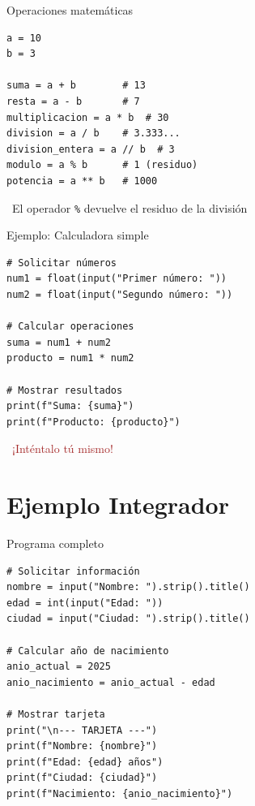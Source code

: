 \documentclass{beamer}
\begin{document}
\begin{frame}[fragile]{Operaciones matemáticas \ \faCalculator}

\begin{lstlisting}
a = 10
b = 3

suma = a + b        # 13
resta = a - b       # 7
multiplicacion = a * b  # 30
division = a / b    # 3.333...
division_entera = a // b  # 3
modulo = a % b      # 1 (residuo)
potencia = a ** b   # 1000
\end{lstlisting}

\vspace{-0.1cm}
\begin{notebox}
\small\faInfoCircle \ El operador \texttt{\%} devuelve el residuo de la división
\end{notebox}
\end{frame}

\begin{frame}[fragile]{Ejemplo: Calculadora simple \ \faDesktop}

\begin{lstlisting}
# Solicitar números
num1 = float(input("Primer número: "))
num2 = float(input("Segundo número: "))

# Calcular operaciones
suma = num1 + num2
producto = num1 * num2

# Mostrar resultados
print(f"Suma: {suma}")
print(f"Producto: {producto}")
\end{lstlisting}

\vspace{-0.1cm}
\begin{center}
\textcolor{brown}{\faRocket \ ¡Inténtalo tú mismo!}
\end{center}
\end{frame}

\section{Ejemplo Integrador}

\begin{frame}[fragile]{Programa completo \ \faIdCard}

\begin{lstlisting}
# Solicitar información
nombre = input("Nombre: ").strip().title()
edad = int(input("Edad: "))
ciudad = input("Ciudad: ").strip().title()

# Calcular año de nacimiento
anio_actual = 2025
anio_nacimiento = anio_actual - edad

# Mostrar tarjeta
print("\n--- TARJETA ---")
print(f"Nombre: {nombre}")
print(f"Edad: {edad} años")
print(f"Ciudad: {ciudad}")
print(f"Nacimiento: {anio_nacimiento}")
\end{lstlisting}
\end{frame}
\end{document}
